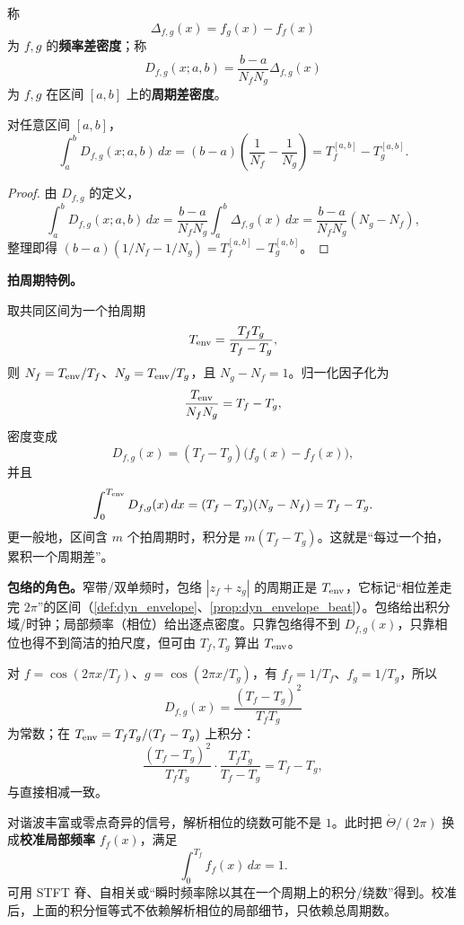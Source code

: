 \begin{definition}[频率差密度与区间周期差密度]
\label{def:dyn_period_difference_density}
称
\[
\Delta_{f,g}(x)=f_g(x)-f_f(x)
\]
为 \(f,g\) 的\textbf{频率差密度}；称
\[
D_{f,g}(x;a,b)=\frac{b-a}{N_fN_g}\Delta_{f,g}(x)
\]
为 \(f,g\) 在区间 \([a,b]\) 上的\textbf{周期差密度}。
\end{definition}

\begin{proposition}[区间积分]
\label{prop:dyn_period_difference_integral}
对任意区间 \([a,b]\)，
\[
\int_a^b D_{f,g}(x;a,b)\,dx
=(b-a)\left(\frac1{N_f}-\frac1{N_g}\right)
=T_f^{[a,b]}-T_g^{[a,b]}.
\]
\end{proposition}

\begin{proof}
由 \(D_{f,g}\) 的定义，
\[
\int_a^b D_{f,g}(x;a,b)\,dx
=\frac{b-a}{N_fN_g}\int_a^b\Delta_{f,g}(x)\,dx
=\frac{b-a}{N_fN_g}(N_g-N_f),
\]
整理即得 \((b-a)(1/N_f-1/N_g)=T_f^{[a,b]}-T_g^{[a,b]}\)。
\end{proof}

\textbf{拍周期特例。}

取共同区间为一个拍周期
\[
T_{\rm env}=\frac{T_fT_g}{T_f-T_g},
\]
则 \(N_f=T_{\rm env}/T_f\)、\(N_g=T_{\rm env}/T_g\)，且 \(N_g-N_f=1\)。归一化因子化为
\[
\frac{T_{\rm env}}{N_fN_g}=T_f-T_g,
\]
密度变成
\[
D_{f,g}(x)=(T_f-T_g)\bigl(f_g(x)-f_f(x)\bigr),
\]
并且
\[
\int_0^{T_{\rm env}}D_{f,g}(x)\,dx
=(T_f-T_g)(N_g-N_f)=T_f-T_g.
\]
更一般地，区间含 \(m\) 个拍周期时，积分是 \(m(T_f-T_g)\)。这就是“每过一个拍，累积一个周期差”。

\textbf{包络的角色。}窄带/双单频时，包络 \(|z_f+z_g|\) 的周期正是 \(T_{\rm env}\)，它标记“相位差走完 \(2\pi\)”的区间（\cref{def:dyn_envelope}、\cref{prop:dyn_envelope_beat}）。包络给出积分域/时钟；局部频率（相位）给出逐点密度。只靠包络得不到 \(D_{f,g}(x)\)，只靠相位也得不到简洁的拍尺度，但可由 \(T_f,T_g\) 算出 \(T_{\rm env}\)。

\begin{example}[纯音检验]
\label{ex:dyn_period_difference_pure_tone}
对 \(f=\cos(2\pi x/T_f)\)、\(g=\cos(2\pi x/T_g)\)，有 \(f_f=1/T_f\)、\(f_g=1/T_g\)，所以
\[
D_{f,g}(x)=\frac{(T_f-T_g)^2}{T_fT_g}
\]
为常数；在 \(T_{\rm env}=T_fT_g/(T_f-T_g)\) 上积分：
\[
\frac{(T_f-T_g)^2}{T_fT_g}\cdot\frac{T_fT_g}{T_f-T_g}=T_f-T_g,
\]
与直接相减一致。
\end{example}

\begin{remark}[任意周期函数的校准]
\label{rem:dyn_period_density_calibration}
对谐波丰富或零点奇异的信号，解析相位的绕数可能不是 \(1\)。此时把 \(\dot\Theta/(2\pi)\) 换成\textbf{校准局部频率} \(f_f(x)\)，满足
\[
\int_0^{T_f} f_f(x)\,dx=1.
\]
可用 STFT 脊、自相关或“瞬时频率除以其在一个周期上的积分/绕数”得到。校准后，上面的积分恒等式不依赖解析相位的局部细节，只依赖总周期数。
\end{remark}

